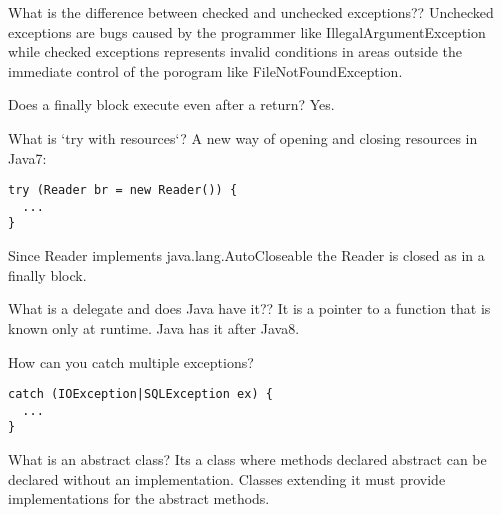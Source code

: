 \begin{flashcard}[Lang]{What is the difference between checked and unchecked exceptions??}
Unchecked exceptions are bugs caused by the programmer like IllegalArgumentException while checked exceptions represents invalid conditions in areas outside the immediate control of the porogram like FileNotFoundException.

\begin{flashcard}[Lang]{Does a finally block execute even after a return?}
Yes.
\end{flashcard}

\begin{flashcard}[Lang]{What is `try with resources`?}
A new way of opening and closing resources in Java7:
\begin{lstlisting}[frame=single]
try (Reader br = new Reader()) {
  ...
}
\end{lstlisting}
Since Reader implements java.lang.AutoCloseable the Reader is closed as in a finally block.
\end{flashcard}

\begin{flashcard}[Lang]{What is a delegate and does Java have it??}
It is a pointer to a function that is known only at runtime. Java has it after Java8.
\end{flashcard}

\begin{flashcard}[Lang]{How can you catch multiple exceptions?}
\begin{lstlisting}[frame=single]
catch (IOException|SQLException ex) {
  ...
}
\end{lstlisting}
\end{flashcard}

\begin{flashcard}[Lang]{What is an abstract class?}
Its a class where methods declared abstract can be declared without an implementation. Classes extending it must provide implementations for the abstract methods.
\end{flashcard}


\end{flashcard}
